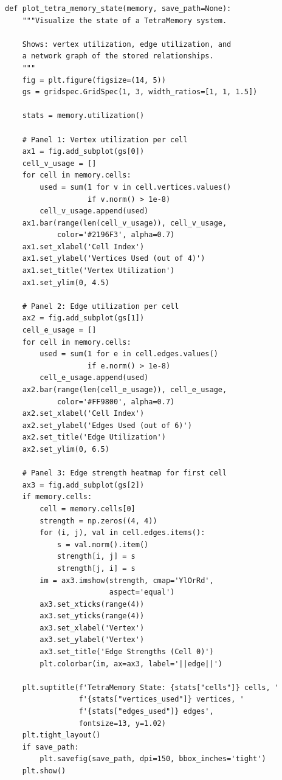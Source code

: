 \begin{lstlisting}[style=dogmapython, caption={Lab 8: TetraMemory state visualization.}]
def plot_tetra_memory_state(memory, save_path=None):
    """Visualize the state of a TetraMemory system.

    Shows: vertex utilization, edge utilization, and
    a network graph of the stored relationships.
    """
    fig = plt.figure(figsize=(14, 5))
    gs = gridspec.GridSpec(1, 3, width_ratios=[1, 1, 1.5])

    stats = memory.utilization()

    # Panel 1: Vertex utilization per cell
    ax1 = fig.add_subplot(gs[0])
    cell_v_usage = []
    for cell in memory.cells:
        used = sum(1 for v in cell.vertices.values()
                   if v.norm() > 1e-8)
        cell_v_usage.append(used)
    ax1.bar(range(len(cell_v_usage)), cell_v_usage,
            color='#2196F3', alpha=0.7)
    ax1.set_xlabel('Cell Index')
    ax1.set_ylabel('Vertices Used (out of 4)')
    ax1.set_title('Vertex Utilization')
    ax1.set_ylim(0, 4.5)

    # Panel 2: Edge utilization per cell
    ax2 = fig.add_subplot(gs[1])
    cell_e_usage = []
    for cell in memory.cells:
        used = sum(1 for e in cell.edges.values()
                   if e.norm() > 1e-8)
        cell_e_usage.append(used)
    ax2.bar(range(len(cell_e_usage)), cell_e_usage,
            color='#FF9800', alpha=0.7)
    ax2.set_xlabel('Cell Index')
    ax2.set_ylabel('Edges Used (out of 6)')
    ax2.set_title('Edge Utilization')
    ax2.set_ylim(0, 6.5)

    # Panel 3: Edge strength heatmap for first cell
    ax3 = fig.add_subplot(gs[2])
    if memory.cells:
        cell = memory.cells[0]
        strength = np.zeros((4, 4))
        for (i, j), val in cell.edges.items():
            s = val.norm().item()
            strength[i, j] = s
            strength[j, i] = s
        im = ax3.imshow(strength, cmap='YlOrRd',
                        aspect='equal')
        ax3.set_xticks(range(4))
        ax3.set_yticks(range(4))
        ax3.set_xlabel('Vertex')
        ax3.set_ylabel('Vertex')
        ax3.set_title('Edge Strengths (Cell 0)')
        plt.colorbar(im, ax=ax3, label='||edge||')

    plt.suptitle(f'TetraMemory State: {stats["cells"]} cells, '
                 f'{stats["vertices_used"]} vertices, '
                 f'{stats["edges_used"]} edges',
                 fontsize=13, y=1.02)
    plt.tight_layout()
    if save_path:
        plt.savefig(save_path, dpi=150, bbox_inches='tight')
    plt.show()
\end{lstlisting}

